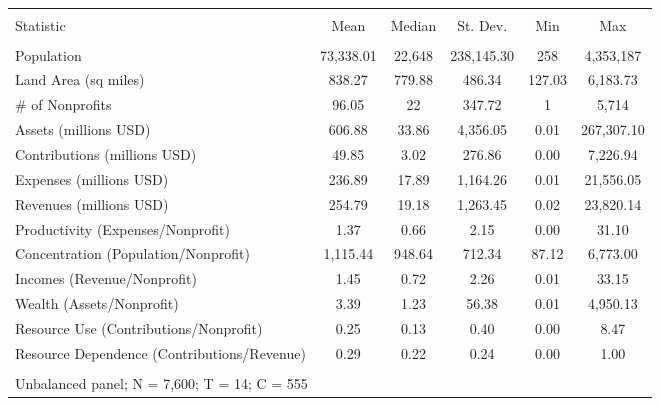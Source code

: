 
\begin{table}[!htbp] \centering 
  \caption{} 
  \label{} 
\begin{tabular}{@{\extracolsep{5pt}}lccccc} 
\\[-1.8ex]\hline 
\hline \\[-1.8ex] 
Statistic & \multicolumn{1}{c}{Mean} & \multicolumn{1}{c}{Median} & \multicolumn{1}{c}{St. Dev.} & \multicolumn{1}{c}{Min} & \multicolumn{1}{c}{Max} \\ 
\hline \\[-1.8ex] 
\quad Population & 73,338.01 & 22,648 & 238,145.30 & 258 & 4,353,187 \\ 
\quad Land Area (sq miles) & 838.27 & 779.88 & 486.34 & 127.03 & 6,183.73 \\ 
\quad \# of Nonprofits & 96.05 & 22 & 347.72 & 1 & 5,714 \\ 
\quad Assets (millions USD) & 606.88 & 33.86 & 4,356.05 & 0.01 & 267,307.10 \\ 
\quad Contributions (millions USD) & 49.85 & 3.02 & 276.86 & 0.00 & 7,226.94 \\ 
\quad Expenses (millions USD) & 236.89 & 17.89 & 1,164.26 & 0.01 & 21,556.05 \\ 
\quad Revenues (millions USD) & 254.79 & 19.18 & 1,263.45 & 0.02 & 23,820.14 \\ 
\quad Productivity (Expenses/Nonprofit) & 1.37 & 0.66 & 2.15 & 0.00 & 31.10 \\ 
\quad Concentration (Population/Nonprofit) & 1,115.44 & 948.64 & 712.34 & 87.12 & 6,773.00 \\ 
\quad Incomes (Revenue/Nonprofit) & 1.45 & 0.72 & 2.26 & 0.01 & 33.15 \\ 
\quad Wealth (Assets/Nonprofit) & 3.39 & 1.23 & 56.38 & 0.01 & 4,950.13 \\ 
\quad Resource Use (Contributions/Nonprofit) & 0.25 & 0.13 & 0.40 & 0.00 & 8.47 \\ 
\quad Resource Dependence (Contributions/Revenue) & 0.29 & 0.22 & 0.24 & 0.00 & 1.00 \\ 
\hline \\[-1.8ex] 
\multicolumn{6}{l}{Unbalanced panel; N = 7,600; T = 14; C = 555} \\ 
\end{tabular} 
\end{table} 
